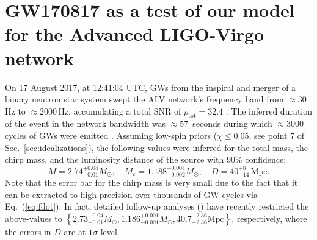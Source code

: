 \documentclass[prd,amsmath,amssymb,aps,floats,amsfonts,notitlepage,superscriptaddress,eqsecnum,nofootinbib,10pt]{revtex4-1}
\newcommand{\be}{\begin{equation}}
\newcommand{\ee}{\end{equation}}
\begin{document}
\begin{enumerate}
%
\end{enumerate}
%
%

\section{GW170817 as a test of our model for the Advanced LIGO-Virgo network}\label{sec:GW170817}
On 17 August 2017, at 12:41:04 UTC, GWs from the inspiral and merger of a binary neutron star system %
swept the ALV network's frequency band from $\approx 30\,$Hz to $\approx 2000\,$Hz, accumulating a total SNR of
$\rho_\text{tot} = 32.4$ \cite{GW170817}.
The inferred duration of the event in the network bandwidth was $\approx 57\,$ seconds during which $\approx 3000$ cycles of GWs were emitted \cite{GW170817_Facts}.
Assuming low-spin priors  ($\chi \le 0.05$, see point 7 of Sec.~\ref{sec:idealizations}), the following values were inferred for the total mass, the chirp mass,
and the luminosity distance of the source with 90\% confidence:
%
\be
M = 2.74^{+0.04}_{-0.01} M_\odot,\quad M_c = 1.188^{+0.004}_{-0.002} M_\odot,\quad D= 40^{+8}_{-14}\,\text{Mpc}. \label{eq:GW170817_params}
\ee
%
Note that the error bar for the chirp mass is very small
due to the fact that it can be extracted to high precision over thousands of GW cycles via Eq.~(\ref{eq:fdot}). In fact, detailed follow-up analyses (\cite{GW170817_2018}) have recently restricted the above-values to
%
$ \left\{2.73^{+0.04}_{-0.01} M_\odot, 1.186^{+0.001}_{-0.001}M_\odot , 40.7^{+2.36}_{-2.36}\text{Mpc}\right\}$, respectively,
%
where the errors in $D$ are at $1\sigma$ level.
\end{document}
